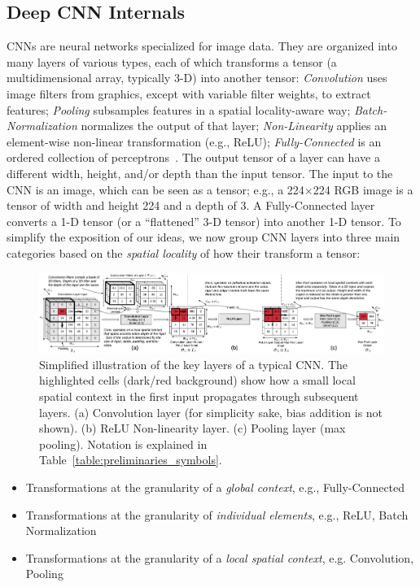 \subsection{Deep CNN Internals}\label{sec:cnn_internals}
CNNs are neural networks specialized for image data. They are organized into many layers of various types, each of which transforms a tensor (a multidimensional array, typically 3-D) into another tensor: \textit{Convolution} uses image filters from graphics, except with variable filter weights, to extract features; \textit{Pooling} subsamples features in a spatial locality-aware way; \textit{Batch-Normalization} normalizes the output of that layer; \textit{Non-Linearity} applies an element-wise non-linear transformation (e.g., ReLU); \textit{Fully-Connected} is an ordered collection of perceptrons~\cite{dlbook}. The output tensor of a layer can have a different width, height, and/or depth than the input tensor. The input to the CNN is an image, which can be seen as a tensor; e.g., a 224$\times$224 RGB image is a tensor of width and height 224 and a depth of 3. A Fully-Connected layer converts a 1-D tensor (or a ``flattened'' 3-D tensor) into another 1-D tensor. To simplify the exposition of our ideas, we now group CNN layers into three main categories based on the \textit{spatial locality} of how their transform a tensor:

\begin{figure}[t]
\includegraphics[width=\textwidth]{images/cnn_simplified}
\caption{Simplified illustration of the key layers of a typical CNN. The highlighted cells (dark/red background) show how a small local spatial context in the first input propagates through subsequent layers. (a) Convolution layer (for simplicity sake, bias addition is not shown). (b) ReLU Non-linearity layer. (c) Pooling layer (max pooling). Notation is explained in Table~\ref{table:preliminaries_symbols}.}
\label{fig:cnn_simplified}
\end{figure}

\begin{itemize}
    \item Transformations at the granularity of a \textit{global context}, e.g., Fully-Connected
    
	\item Transformations at the granularity of \textit{individual elements}, e.g., ReLU, Batch Normalization

	\item Transformations at the granularity of a \textit{local spatial context}, e.g. Convolution, Pooling
\end{itemize}

